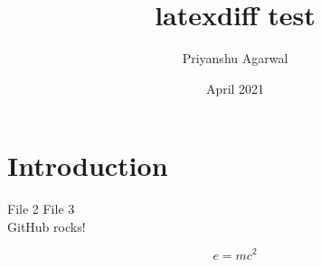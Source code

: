 \documentclass{article}
\title{latexdiff test}
\author{Priyanshu Agarwal}
\date{April 2021}
\begin{document}
\maketitle

\section{Introduction}

File 2
File 3
\\GitHub rocks!

\begin{equation}
    e = mc^2
\end{equation}
\end{document}
